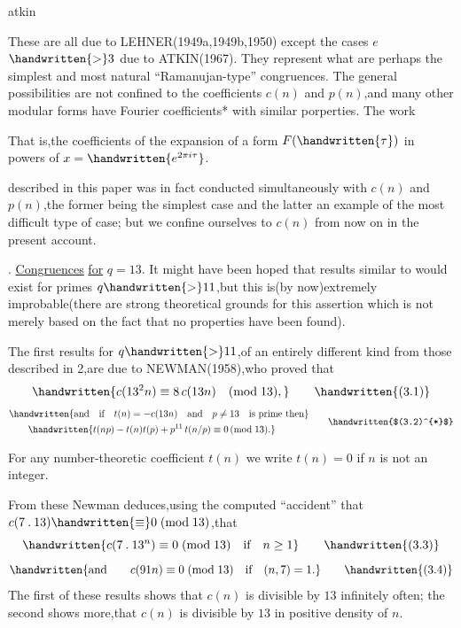 \noindent\hfill atkin 

\noindent These are all due to LEHNER(1949a,1949b,1950) except the cases \uline{$e$}$\handwritten{>}3$ due to ATKIN(1967). They represent what are perhaps the simplest and most natural ``Ramanujan-type'' congruences. The general possibilities are not confined to the coefficients \uline{$c(n)$} and \uline{$p(n)$},and many other modular forms have Fourier coefficients* with similar porperties. The work

\noindent\handwritten{\rule{\linewidth}{0.4pt}}

\noindent *That is,the coefficients of the expansion of a form $F(\handwritten{\tau})$ in powers of $x=\handwritten{e^{2\pi i\tau}}$.

\noindent\handwritten{\rule{\linewidth}{0.4pt}}

\noindent described in this paper was in fact conducted simultaneously with \uline{$c(n)$} and \uline{$p(n)$},the former being the simplest case and the latter an example of the most difficult type of case; but we confine ourselves to \uline{$c(n)$} from now on in the present account.

. \uline{Congruences} \uline{for} $q=13$. It might have been hoped that results similar to  would exist for primes $q\handwritten{>}11$,but this is(by now)extremely improbable(there are strong theoretical grounds for this assertion which is not merely based on the fact that no properties have been found).

\noindent The first results for $q\handwritten{>}11$,of an entirely different kind from those described in \handwritten{\S}2,are due to NEWMAN(1958),who proved that
\[
\handwritten{c(13^{2}n)\equiv8\,c(13n)\quad(\mathrm{mod}\;13),}
\tag*{\handwritten{(3.1)}}
\]
\[
\begin{aligned}
&\handwritten{\text{and}\quad\text{if}\quad t(n)=-c(13n)\quad\text{and}\quad p\ne13\quad\text{is prime then}}\\
&\qquad\handwritten{t(np)-t(n)t(p)+p^{11}\,t(n/p)\equiv0\,(\mathrm{mod}\;13).}
\end{aligned}
\tag*{\handwritten{$(3.2)^{*}$}}
\]

\noindent\handwritten{\rule{\linewidth}{0.4pt}}

\noindent *For any number-theoretic coefficient \uline{$t(n)$} we write $t(n)=0$ if \uline{$n$} is not an integer.

\noindent\handwritten{\rule{\linewidth}{0.4pt}}

From these Newman deduces,using the computed ``accident'' that $c(7\mathbin{.}13)\handwritten{\equiv}0\;(\mathrm{mod}\;13)$,that
\[
\handwritten{c(7\mathbin{.}13^{n})\equiv0\;(\mathrm{mod}\;13)\quad \text{if}\quad n\geq1}
\tag*{\handwritten{(3.3)}}
\]
\[
\handwritten{\text{and}\qquad c(91n)\equiv0\;(\mathrm{mod}\;13)\quad \text{if}\quad(n,7)=1.}
\tag*{\handwritten{(3.4)}}
\]
The first of these results shows that \uline{$c(n)$} is divisible by $13$ infinitely often; the second shows more,that \uline{$c(n)$} is divisible by $13$ in positive density of \uline{$n$}.

